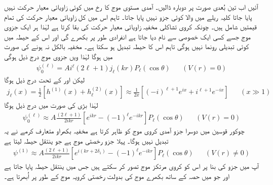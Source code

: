 آئیں اب تین بُعدی صورت پر دوبارہ ڈالیں۔ آمدی مستوی موج  کا  رخ میں کوئی زاویائی معیار حرکت نہیں پایا جاتا کلیہ ریلے میں  والا کوئی جزو نہیں پایا جاتا۔ تاہم اس میں کل زاویائی معیار حرکت  کی تمام قیمتیں شامل ہیں۔ چونکہ کروی تشاکلی مخفیہ زاویائی معیار حرکت کی بقا کرتا ہے لہٰذا ہر ایک جزوی موج جسے کسی ایک خصوصی  سے نام دیا جاتا ہے انفرادی طور پر بکھرے گی اور اس کے حیطہ میں کوئی تبدیلی رونما نہیں ہوگی تاہم اس کا حیطہ تبدیل ہو سکتا ہے۔ مخفیہ بالکل  نہ ہونے کی صورت میں  ہوگا لہٰذا ویں جزوی موج درج ذیل ہوگی 
\begin{align}
	\psi_0^{(\ell)} = Ai^{\ell}(2\ell+1)j_{\ell}(kr)P_{\ell}(\cos\theta)&&(V(r)=0)
\end{align}
لیکن  اور  کے تحت درج ذیل ہوگا
\begin{align}
	j_{\ell}(x) = \frac{1}{2}\left[h^{(1)}(x)+h_{\ell}^{(2)}(x)\right]\approx\frac{1}{2x}\left[(-i)^{\ell+1}e^{ix}+i^{\ell+1}e^{-ix}\right]&&(x\gg1)
\end{align}
لہٰذا بڑی  کی صورت میں درج ذیل ہوگا
\begin{align}
	\psi_0^{(\ell)}\approx A\frac{(2\ell+1)}{2ikr}\left[e^{ikr}-(-1)^{\ell}e^{-ikr}\right]P_{\ell}(\cos\theta)&&(V(r)=0)
\end{align}
چوکور قوسین میں دوسرا جزو آمدی کروی موج کو ظاہر کرتا ہے مخفیہ بکھراو متعارف کرمے نے یہ تبدیل نہیں ہوگا۔ پہلا جزو رخصتی موج ہے جو ینتقل حیطہ  لیتا ہے
\begin{align}
	\psi^{(1)}\approx A\frac{(2\ell+1)}{2ikr}\left[e^{i(kr+2\delta_1)}-(-1)^{\ell}e^{-ikr}\right]P_{\ell}(\cos\theta)&&(V(r)\neq0)
\end{align}
آپ  میں  جزو کی بنا پر اس کو کروی مرتکز موج تصور کر سکتے ہیں جس میں  ینتقل حیطہ پایا جاتا ہے اور جو  میں  حصہ کے ساتھ بکھرے موج کی بدولت رخصتی کرویہ موج کے طور پر اُبھرتا ہے۔

